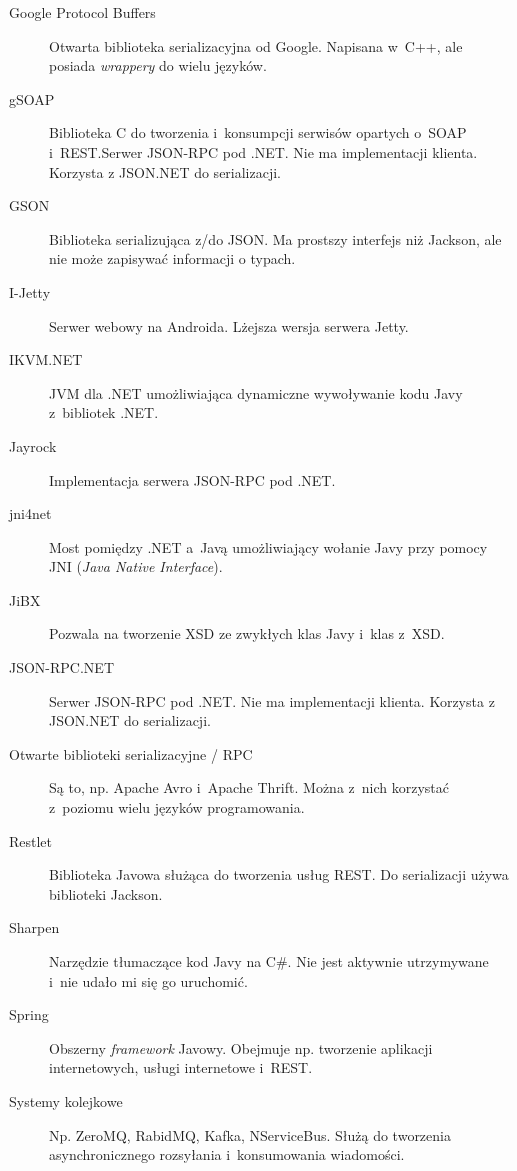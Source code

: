 \begin{description}
\item[Google Protocol Buffers] Otwarta biblioteka serializacyjna od Google. Napisana w~C++, ale posiada \emph{wrappery} do wielu języków.
\item[gSOAP] Biblioteka C do tworzenia i~konsumpcji serwisów opartych o~SOAP i~REST.Serwer JSON-RPC pod .NET. Nie ma implementacji klienta. Korzysta z JSON.NET do serializacji.
\item[GSON] Biblioteka serializująca z/do JSON. Ma prostszy interfejs niż Jackson, ale nie może zapisywać informacji o typach.
\item[I-Jetty] Serwer webowy na Androida. Lżejsza wersja serwera Jetty.
\item[IKVM.NET] JVM dla .NET umożliwiająca dynamiczne wywoływanie kodu Javy z~bibliotek .NET.
\item[Jayrock] Implementacja serwera JSON-RPC pod .NET.
\item[jni4net] Most pomiędzy .NET a~Javą umożliwiający wołanie Javy przy pomocy JNI (\emph{Java Native Interface}).
\item[JiBX] Pozwala na tworzenie XSD ze zwykłych klas Javy i~klas z~XSD.
\item[JSON-RPC.NET] Serwer JSON-RPC pod .NET. Nie ma implementacji klienta. Korzysta z JSON.NET do serializacji.
\item[Otwarte biblioteki serializacyjne / RPC] Są to, np. Apache Avro i~Apache Thrift. Można z~nich korzystać z~poziomu wielu języków programowania.
\item[Restlet] Biblioteka Javowa służąca do tworzenia usług REST. Do serializacji używa biblioteki Jackson.
\item[Sharpen] Narzędzie tłumaczące kod Javy na C\#. Nie jest aktywnie utrzymywane i~nie udało mi się go uruchomić.
\item[Spring] Obszerny \emph{framework} Javowy. Obejmuje np. tworzenie aplikacji internetowych, usługi internetowe i~REST.
\item[Systemy kolejkowe] Np. ZeroMQ, RabidMQ, Kafka, NServiceBus. Służą do tworzenia asynchronicznego rozsyłania i~konsumowania wiadomości.

\end{description}

%


